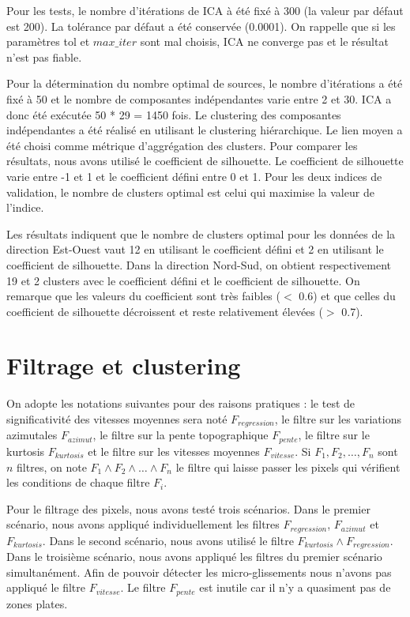 \documentclass[11pt, openany]{report}
\begin{document}
Pour les tests, le nombre d'itérations de ICA à été fixé à 300 (la valeur par défaut est 200). La tolérance par défaut a été conservée (0.0001).  On rappelle que  si les paramètres tol et $max\_iter$ sont mal choisis, ICA ne converge pas et le résultat n’est pas fiable.

Pour la détermination du nombre optimal de sources, le nombre d’itérations a été fixé à 50  et le nombre de composantes indépendantes varie entre 2 et 30.  ICA a donc été exécutée  50 * 29 = 1450 fois. Le clustering des composantes indépendantes a été réalisé en utilisant le clustering hiérarchique. Le lien moyen a été choisi comme métrique d'aggrégation des clusters. Pour comparer les résultats, nous avons utilisé le coefficient de silhouette. Le coefficient de silhouette varie entre  -1 et 1 et  le coefficient défini entre 0 et 1. Pour les deux indices de validation, le nombre de clusters optimal est celui qui maximise la valeur de l'indice.

Les résultats indiquent que le nombre de clusters optimal pour les données de la direction Est-Ouest vaut 12 en utilisant le coefficient défini et 2 en utilisant le coefficient de silhouette. Dans la direction Nord-Sud, on obtient respectivement 19 et 2 clusters avec le coefficient défini et le coefficient de silhouette. On remarque que les valeurs du coefficient sont très faibles ($<$ 0.6) et que celles du coefficient de silhouette décroissent et reste relativement élevées ($>$ 0.7).

\section{Filtrage et clustering}
On adopte les notations suivantes pour des raisons pratiques : le test de significativité des vitesses moyennes sera noté $F_{regression}$, le filtre sur les variations azimutales $F_{azimut}$, le filtre sur la pente topographique $F_{pente}$, le filtre sur le kurtosis $F_{kurtosis}$ et le filtre sur les vitesses moyennes $F_{vitesse}$. Si $F_1, F_2,\ldots, F_n$ sont $n$ filtres, on note $F_1 \wedge F_2 \wedge \ldots \wedge F_n$ le filtre qui laisse passer les pixels qui vérifient les conditions  de chaque filtre $F_i$.

Pour le filtrage des pixels, nous avons testé trois scénarios. Dans le premier scénario, nous avons appliqué individuellement les filtres $F_{regression}$, $F_{azimut}$ et $F_{kurtosis}$. Dans le second scénario, nous avons utilisé le filtre $F_{kurtosis} \wedge F_{regression}$. Dans le troisième scénario, nous avons appliqué les filtres du premier scénario simultanément. Afin de pouvoir détecter les micro-glissements nous n'avons pas appliqué le filtre $F_{vitesse}$. Le filtre $F_{pente}$ est inutile car il n'y a quasiment pas de zones plates.
\end{document}
